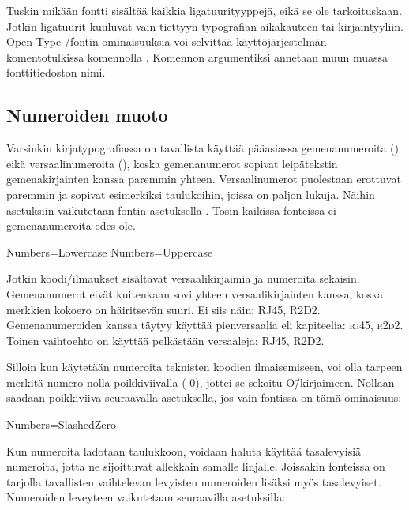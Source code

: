 Tuskin mikään fontti sisältää kaikkia ligatuurityyppejä, eikä se ole
tarkoituskaan. Jotkin ligatuurit kuuluvat vain tiettyyn typografian
aikakauteen tai kirjaintyyliin. Open Type \=/fontin ominaisuuksia voi
selvittää käyttöjärjestelmän komentotulkissa komennolla
. Komennon argumentiksi annetaan muun muassa
fonttitiedoston nimi.

\subsection{Numeroiden muoto}
\label{luku:fontit_numerot}

Varsinkin kirjatypografiassa on tavallista käyttää pääasiassa
gemenanumeroita ({}) eikä versaalinumeroita
({}), koska gemenanumerot sopivat leipätekstin
gemenakirjainten kanssa paremmin yhteen. Versaalinumerot puolestaan
erottuvat paremmin ja sopivat esimerkiksi taulukoihin, joissa on paljon
lukuja. Näihin asetuksiin vaikutetaan fontin asetuksella
. Tosin kaikissa fonteissa ei gemenanumeroita edes ole.

\begin{koodilohkosis}
Numbers=Lowercase %
Numbers=Uppercase %
\end{koodilohkosis}

Jotkin koodi\-/ilmaukset sisältävät versaalikirjaimia ja numeroita
sekaisin. Gemenanumerot eivät kuitenkaan sovi yhteen versaalikirjainten
kanssa, koska merkkien kokoero on häiritsevän suuri. Ei siis näin:
RJ45, R2D2. Gemenanumeroiden kanssa täytyy käyttää pienversaalia eli
kapiteelia: \textsc{rj45}, \textsc{r2d2}. Toinen vaihtoehto on käyttää
pelkästään versaaleja: {\versaalinum RJ45, R2D2}.

Silloin kun käytetään numeroita teknisten koodien ilmaisemiseen, voi
olla tarpeen merkitä numero nolla poikkiviivalla
({ 0}), jottei se
sekoitu O\=/kirjaimeen. Nollaan saadaan poikkiviiva seuraavalla
asetuksella, jos vain fontissa on tämä ominaisuus:

\begin{koodilohkosis}
Numbers=SlashedZero
\end{koodilohkosis}

Kun numeroita ladotaan taulukkoon, voidaan haluta käyttää tasalevyisiä
numeroita, jotta ne sijoittuvat allekkain samalle linjalle. Joissakin
fonteissa on tarjolla tavallisten vaihtelevan levyisten numeroiden
lisäksi myös tasalevyiset. Numeroiden leveyteen vaikutetaan seuraavilla
asetuksilla:

